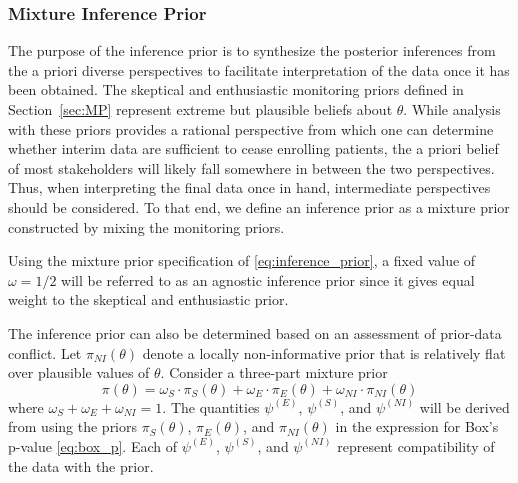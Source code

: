 \documentclass[useAMS,usenatbib,referee]{biom}
\begin{document}
%

%



\subsubsection{Mixture Inference Prior}
The purpose of the inference prior is to synthesize the posterior inferences from the a priori diverse perspectives to facilitate interpretation of the data once it has been obtained. The skeptical and enthusiastic monitoring priors defined in Section~\ref{sec:MP} represent extreme but plausible beliefs about $\theta$.
%
While analysis with these priors provides a rational perspective from which one can determine whether interim data are sufficient 
to cease enrolling patients, the a priori belief of most stakeholders will likely fall somewhere in between the two perspectives.
%
Thus, when interpreting the final data once in hand, intermediate perspectives should be considered.
%
To that end, we define an inference prior as a mixture prior constructed by mixing the monitoring priors.

Using the mixture prior specification of \eqref{eq:inference_prior}, a fixed value of $\omega=1/2$ will be referred to as an agnostic inference prior since it gives equal weight to the skeptical and enthusiastic prior.

The inference prior can also be determined based on an assessment of prior-data conflict. Let $\pi_{NI}(\theta)$ denote a locally non-informative prior that is relatively flat over plausible values of $\theta$. Consider a three-part mixture prior
\begin{equation}\label{eq:3partmix}
\pi(\theta)=\omega_S\cdot \pi_S(\theta)+\omega_E\cdot\pi_E(\theta)+\omega_{NI}\cdot\pi_{NI}(\theta)
\end{equation}
where $\omega_S+\omega_E+\omega_{NI}=1$. The quantities $\psi^{(E)}$, $\psi^{(S)}$, and $\psi^{(NI)}$ will be derived from using the priors $\pi_S(\theta)$, $\pi_E(\theta)$, and $\pi_{NI}(\theta)$ in the expression for Box's p-value \eqref{eq:box_p}. Each of $\psi^{(E)}$, $\psi^{(S)}$, and $\psi^{(NI)}$ represent compatibility of the data with the prior. 
\end{document}
